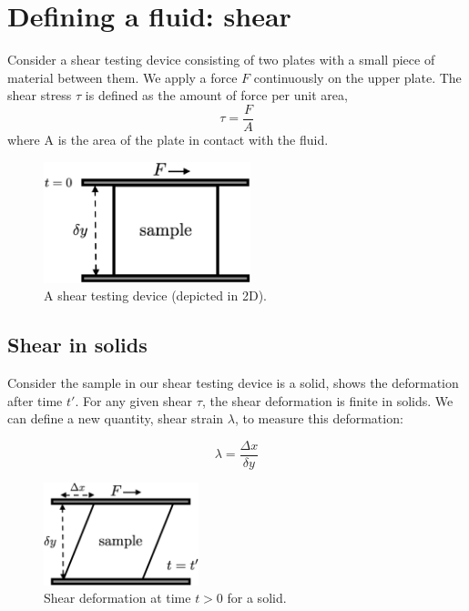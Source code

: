 \section{Defining a fluid: shear}

Consider a shear testing device consisting of two plates with a small piece of material between them. We apply a force $F$ continuously on the upper plate. The shear stress $\tau$ is defined as the amount of force per unit area,
\begin{equation}
  \tau = \frac{F}{A}
\end{equation}
where A is the area of the plate in contact with the fluid.

\begin{figure}[h] \label{fig:shear-testing}
  \centering
  \includegraphics[width=6cm]{fig/shear-testing.png}
  \caption{A shear testing device (depicted in 2D).}
\end{figure}


\subsection*{Shear in solids}

Consider the sample in our shear testing device is a solid,  shows the deformation after time $t'$. For any given shear $\tau$, the shear deformation is finite in solids. We can define a new quantity, shear strain $\lambda$, to measure this deformation:

\begin{equation} \label{eq:shear-strain-defn}
  \lambda = \frac{ \Delta x }{ \delta y }
\end{equation}

\begin{figure} \label{fig:shear-solids}
  \centering
  \includegraphics[width=4.5cm]{fig/shear-solid.png}
  \caption{Shear deformation at time $t>0$ for a solid.}
\end{figure}

